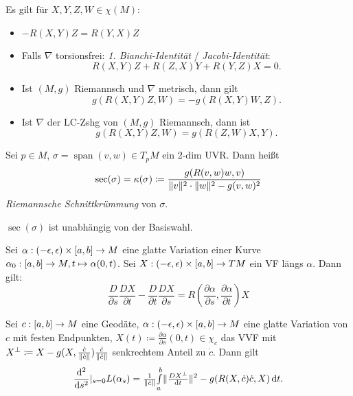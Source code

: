 \documentclass{cheat-sheet}
\newcommand{\vinterval}{\ointerval{-\epsilon}{\epsilon}} %
\DeclareMathOperator{\Span}{span} %
\newcommand{\abinterval}{\cinterval{a}{b}} %
\begin{document}
\begin{satz}
  Es gilt für $X,Y,Z,W \in \chi(M)$:
  \begin{itemize}
    \item $- R(X, Y)Z = R(Y, X)Z$
    \item Falls $\nabla$ torsionsfrei: \emph{1. Bianchi-Identität} / \emph{Jacobi-Identität}:
    \[ R(X,Y)Z + R(Z,X)Y + R(Y,Z)X = 0. \]
    \item Ist $(M, g)$ Riemannsch und $\nabla$ metrisch, dann gilt
    \[ g(R(X,Y)Z, W) = -g(R(X,Y)W, Z). \]
    \item Ist $\nabla$ der LC-Zshg von $(M, g)$ Riemannsch, dann ist
    \[ g(R(X, Y)Z, W) = g(R(Z,W)X,Y). \]
  \end{itemize}
\end{satz}


\begin{defn}
  Sei $p \in M$, $\sigma = \Span(v,w) \in T_p M$ ein 2-dim UVR. Dann heißt
  \[ \sec(\sigma) = \kappa(\sigma) \coloneqq \frac{g(R(v,w)w,v)}{\lVert v\rVert^2 \cdot \lVert w\rVert^2 - g(v,w)^2} \]
  \emph{Riemannsche Schnittkrümmung} von $\sigma$.
\end{defn}

\begin{lem}
  $\sec(\sigma)$ ist unabhängig von der Basiswahl.
\end{lem}


\begin{satz}
  Sei $\alpha : \vinterval \times \abinterval \to M$ eine glatte Variation einer Kurve $\alpha_0 : \abinterval \to M, t \mapsto \alpha(0, t)$.
  Sei $X : \vinterval \times \abinterval \to TM$ ein VF längs $\alpha$. Dann gilt:
  \[
    \frac{D}{\partial s} \frac{DX}{\partial t} - \frac{D}{\partial t} \frac{DX}{\partial s} = R\left(\frac{\partial \alpha}{\partial s}, \frac{\partial \alpha}{\partial t}\right) X
  \]
\end{satz}

\begin{satz}
  Sei $c: \abinterval \to M$ eine Geodäte, $\alpha : \vinterval \times \abinterval \to M$ eine glatte Variation von $c$ mit festen Endpunkten, $X(t) \coloneqq \tfrac{\partial \alpha}{\partial s}(0, t) \in \chi_c$ das VVF mit $X^\perp \coloneqq X - g(X, \tfrac{\dot{c}}{\lVert\dot{c}\rVert}) \tfrac{\dot{c}}{\lVert\dot{c}\rVert}$ senkrechtem Anteil zu $\dot{c}$. Dann gilt
  \[
    \frac{\mathrm{d}^2}{\mathrm{d} s^2} |_{s=0} L(\alpha_s) = \tfrac{1}{\lVert\dot{c}\rVert} {\textstyle \int\limits_{a}^{b}} \lVert\tfrac{D X^\perp}{\mathrm{d} t}\rVert^2 - g(R(X,\dot{c})\dot{c},X) \,\mathrm{d} t.
  \]
\end{satz}
\end{document}
